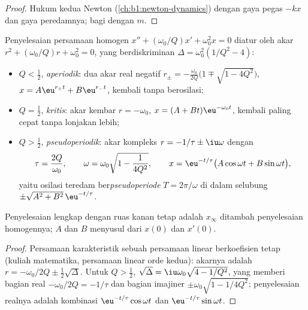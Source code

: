 \begin{proof}
Hukum kedua Newton (\cref{ch:b1:newton-dynamics}) dengan gaya pegas
$-kx$ dan gaya peredamnya; bagi dengan $m$.
\end{proof}

\begin{theorem}\label{thm:b1:transient-regimes:regimes}
Penyelesaian persamaan homogen $x'' + (\omega_0/Q)x' +
\omega_0^2 x = 0$ diatur oleh akar $r^2 + (\omega_0/Q)r +
\omega_0^2 = 0$, yang berdiskriminan $\Delta = \omega_0^2(1/Q^2 - 4)$:
\begin{itemize}
  \item $Q < \tfrac12$, \emph{aperiodik}: dua akar real negatif
        $r_\pm = -\frac{\omega_0}{2Q}\big(1 \mp \sqrt{1 - 4Q^2}\big)$,
        $x = A\eu^{r_+t} + B\eu^{r_-t}$, kembali tanpa berosilasi;
  \item $Q = \tfrac12$, \emph{kritis}: akar kembar $r = -\omega_0$,
        $x = (A + Bt)\eu^{-\omega_0 t}$, kembali paling cepat tanpa
        lonjakan lebih;
  \item $Q > \tfrac12$, \emph{pseudoperiodik}: akar kompleks
        $r = -1/\tau \pm \iu\omega$ dengan
        \[
        \tau = \frac{2Q}{\omega_0}, \qquad
        \omega = \omega_0\sqrt{1 - \frac{1}{4Q^2}},
        \qquad
        x = \eu^{-t/\tau}\big(A\cos\omega t + B\sin\omega t\big),
        \]
        yaitu osilasi teredam ber\emph{pseudoperiode} $T = 2\pi/\omega$
        di dalam selubung $\pm\sqrt{A^2 + B^2}\,\eu^{-t/\tau}$.
\end{itemize}
Penyelesaian lengkap dengan ruas kanan tetap adalah $x_\infty$ ditambah
penyelesaian homogennya; $A$ dan $B$ menyusul dari $x(0)$ dan $x'(0)$.
\end{theorem}

\begin{proof}
Persamaan karakteristik sebuah persamaan linear berkoefisien tetap
(kuliah matematika, persamaan linear orde kedua): akarnya adalah
$r = -\omega_0/2Q \pm \tfrac12\sqrt\Delta$. Untuk $Q > \tfrac12$,
$\sqrt\Delta = \iu\omega_0\sqrt{4 - 1/Q^2}$, yang memberi bagian real
$-\omega_0/2Q = -1/\tau$ dan bagian imajiner $\pm\omega_0\sqrt{1 - 1/4Q^2}$;
penyelesaian realnya adalah kombinasi $\eu^{-t/\tau}\cos\omega t$
dan $\eu^{-t/\tau}\sin\omega t$.
\end{proof}

